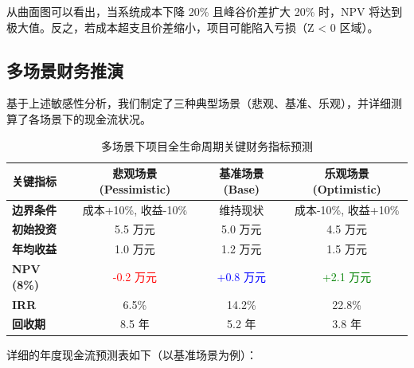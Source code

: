 从曲面图可以看出，当系统成本下降 20\% 且峰谷价差扩大 20\% 时，NPV 将达到极大值。反之，若成本超支且价差缩小，项目可能陷入亏损（Z < 0 区域）。

\subsection{多场景财务推演}
基于上述敏感性分析，我们制定了三种典型场景（悲观、基准、乐观），并详细测算了各场景下的现金流状况。

\begin{table}[htbp]
    \centering
    \caption{多场景下项目全生命周期关键财务指标预测}
    \label{tab:scenarios}
    \renewcommand{\arraystretch}{1.5}
    \begin{tabular}{|l|c|c|c|}
        \hline
        \textbf{关键指标}      & \textbf{悲观场景 (Pessimistic)} & \textbf{基准场景 (Base)}      & \textbf{乐观场景 (Optimistic)} \\ \hline
        \textbf{边界条件}      & 成本+10\%, 收益-10\%            & 维持现状                      & 成本-10\%, 收益+10\%           \\ \hline
        \textbf{初始投资}      & 5.5 万元                      & 5.0 万元                    & 4.5 万元                     \\ \hline
        \textbf{年均收益}      & 1.0 万元                      & 1.2 万元                    & 1.5 万元                     \\ \hline
        \textbf{NPV (8\%)} & \textcolor{red}{-0.2 万元}    & \textcolor{blue}{+0.8 万元} & \textcolor{green}{+2.1 万元} \\ \hline
        \textbf{IRR}       & 6.5\%                       & 14.2\%                    & 22.8\%                     \\ \hline
        \textbf{回收期}       & 8.5 年                       & 5.2 年                     & 3.8 年                      \\ \hline
    \end{tabular}
\end{table}

详细的年度现金流预测表如下（以基准场景为例）：

